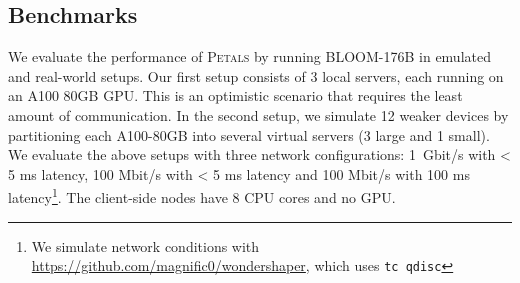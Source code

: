 
\subsection{Benchmarks}

We evaluate the performance of \textsc{Petals} by running BLOOM-176B in emulated and real-world setups. Our first setup consists of 3 local servers, each running on an A100 80GB GPU. This is an optimistic scenario that requires the least amount of communication.
In the second setup, we simulate 12 weaker devices by partitioning each A100-80GB into several virtual servers (3 large and 1 small). %
We evaluate the above setups with three network configurations: 1~Gbit/s with < 5 ms latency, 100 Mbit/s with < 5 ms latency and 100 Mbit/s with 100 ms latency\footnote{We simulate network conditions with \url{https://github.com/magnific0/wondershaper}, which uses \texttt{tc qdisc}}. The client-side nodes have 8 CPU cores and no GPU.


